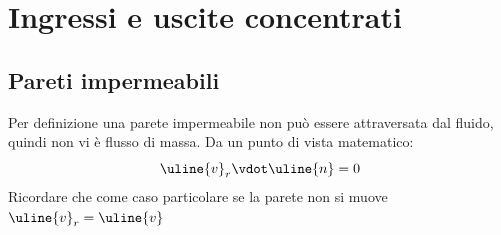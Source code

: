 %
\section{Ingressi e uscite concentrati}

\subsection{Pareti impermeabili}
Per definizione una parete impermeabile non può essere attraversata dal fluido, quindi non vi è flusso di massa. 
Da un punto di vista matematico:
%
	\begin{equation*}
		\uline{v}_r \vdot \uline{n} = 0
	\end{equation*}
%
Ricordare che come caso particolare se la parete non si muove $\uline{v}_r = \uline{v}$

